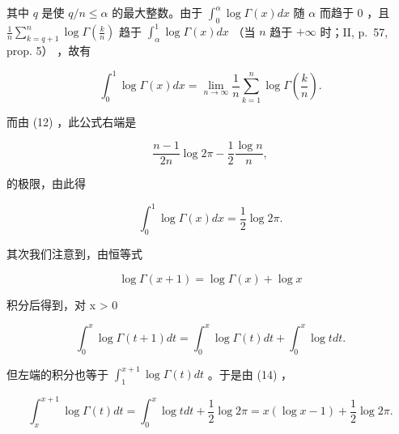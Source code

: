 其中 \(q\) 是使 \(q / n \leqslant \alpha\) 的最大整数。由于 \(\int_{0}^{\alpha} \log \Gamma(x) dx\) 随 \(\alpha\) 而趋于 0 ，且 \(\frac{1}{n} \sum_{k=q+1}^{n} \log \Gamma\left(\frac{k}{n}\right)\) 趋于 \(\int_{\alpha}^{1} \log \Gamma(x) dx\) （当 \(n\) 趋于 \(+\infty\) 时；II, p.~57, prop. 5） ，故有

\[
\int_ {0} ^ {1} \log \Gamma (x) d x = \lim _ {n \rightarrow \infty} \frac {1}{n} \sum_ {k = 1} ^ {n} \log \Gamma \left(\frac {k}{n}\right).
\]

而由 (12) ，此公式右端是

\[
\frac {n - 1}{2 n} \log 2 \pi - \frac {1}{2} \frac {\log n}{n},
\]

的极限，由此得

\[
\int_ {0} ^ {1} \log \Gamma (x) d x = \frac {1}{2} \log 2 \pi .\tag{14}
\]

其次我们注意到，由恒等式

\[
\log \Gamma (x + 1) = \log \Gamma (x) + \log x
\]

积分后得到，对 x \textgreater{} 0

\[
\int_ {0} ^ {x} \log \Gamma (t + 1) d t = \int_ {0} ^ {x} \log \Gamma (t) d t + \int_ {0} ^ {x} \log t d t.
\]

但左端的积分也等于 \(\int_{1}^{x + 1}\log \Gamma (t)dt\) 。于是由 (14) ，

\[
\int_ {x} ^ {x + 1} \log \Gamma (t) d t = \int_ {0} ^ {x} \log t d t + \frac {1}{2} \log 2 \pi = x (\log x - 1) + \frac {1}{2} \log 2 \pi .
\]

